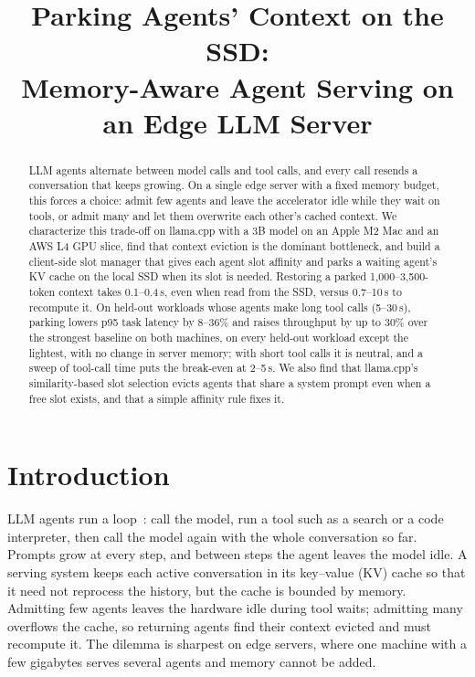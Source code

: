 \documentclass[conference,letterpaper]{IEEEtran}
\begin{document}
\title{Parking Agents' Context on the SSD:\\Memory-Aware Agent Serving on an Edge LLM Server}

\author{
}

\maketitle
\thispagestyle{plain}\pagestyle{plain}

\begin{abstract}
LLM agents alternate between model calls and tool calls, and every call resends a conversation that keeps growing. On a single edge server with a fixed memory budget, this forces a choice: admit few agents and leave the accelerator idle while they wait on tools, or admit many and let them overwrite each other's cached context. We characterize this trade-off on llama.cpp with a 3B model on an Apple M2 Mac and an AWS L4 GPU slice, find that context eviction is the dominant bottleneck, and build a client-side slot manager that gives each agent slot affinity and parks a waiting agent's KV cache on the local SSD when its slot is needed. Restoring a parked 1,000--3,500-token context takes 0.1--0.4\,s, even when read from the SSD, versus 0.7--10\,s to recompute it. On held-out workloads whose agents make long tool calls (5--30\,s), parking lowers p95 task latency by 8--36\% and raises throughput by up to 30\% over the strongest baseline on both machines, on every held-out workload except the lightest, with no change in server memory; with short tool calls it is neutral, and a sweep of tool-call time puts the break-even at 2--5\,s. We also find that llama.cpp's similarity-based slot selection evicts agents that share a system prompt even when a free slot exists, and that a simple affinity rule fixes it.
\end{abstract}

\section{Introduction}
LLM agents run a loop~\cite{yao2023react}: call the model, run a tool such as a search or a code interpreter, then call the model again with the whole conversation so far. Prompts grow at every step, and between steps the agent leaves the model idle. A serving system keeps each active conversation in its key--value (KV) cache so that it need not reprocess the history, but the cache is bounded by memory. Admitting few agents leaves the hardware idle during tool waits; admitting many overflows the cache, so returning agents find their context evicted and must recompute it. The dilemma is sharpest on edge servers, where one machine with a few gigabytes serves several agents and memory cannot be added.
\end{document}
